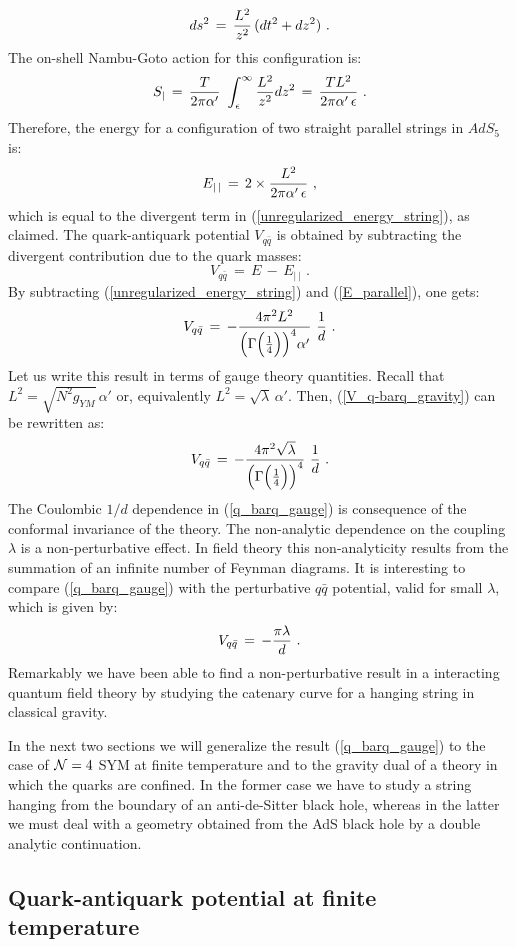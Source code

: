 \documentclass[12pt,notitlepage,a4paper]{article}
\newcommand{\beq}{\begin{equation}}
\newcommand{\eeq}{\end{equation}}
\begin{document}
\beq
ds^2\,=\,{L^2\over z^2}\,(dt^2+dz^2)\,\,.
\eeq
The on-shell Nambu-Goto action for this configuration is:
\beq
S_{|}\,=\,{T\over 2\pi\alpha'}\,\,\int_{\epsilon}^{\infty} {L^2\over z^2} dz^2\,=\,
{TL^2\over  2\pi\alpha'\,\epsilon}\,\,.
\eeq
Therefore, the energy for a configuration of two straight parallel strings in $AdS_5$ is:
\beq
E_{|\,|}\,=\,2\times {L^2\over  2\pi\alpha'\,\epsilon}\,\,,
\label{E_parallel}
\eeq
which is equal to the divergent term in (\ref{unregularized_energy_string}), as claimed. 
The quark-antiquark potential $V_{q\bar q}$ is obtained by subtracting the divergent contribution due to the quark masses:
\beq
V_{q\bar q}\,=\,E\,-\,E_{|\,|}\,\,.
\eeq
By subtracting (\ref{unregularized_energy_string}) and (\ref{E_parallel}), one gets:
\beq
V_{q\bar q}\,=\,-{4\pi^2 L^2\over \Big(\Gamma\Big({1\over 4}\Big)\Big)^4
\alpha'}\,\,{1\over d}\,\,.
\label{V_q-barq_gravity}
\eeq
Let us write this result in terms of gauge theory quantities. Recall that 
$L^2=\sqrt{N^2 g_{YM}}\,\alpha'$ or, equivalently $L^2=\sqrt{\lambda}\,\alpha'$. Then, (\ref{V_q-barq_gravity}) can be rewritten as:
\beq
V_{q\bar q}\,=\,-{4\pi^2 \sqrt{\lambda}\over \Big(\Gamma\Big({1\over 4}\Big)\Big)^4 }\,\,{1\over d}\,\,.
\label{q_barq_gauge}
\eeq
The Coulombic $1/d$ dependence in (\ref{q_barq_gauge}) is consequence of the conformal invariance of the theory. The non-analytic dependence on the coupling $\lambda$ is a non-perturbative effect. In field theory this non-analyticity  results from the summation of an infinite number of Feynman diagrams. It is interesting to compare (\ref{q_barq_gauge}) with the perturbative $q\bar q$ potential, valid for small $\lambda$, which is given by:
\beq
V_{q\bar q}\,=\,-{\pi\lambda\over d}\,\,.
\eeq
Remarkably we have been able to find a non-perturbative result in a interacting quantum field theory by studying the catenary curve for a hanging string in classical gravity. 

In the next two sections we will generalize the result (\ref{q_barq_gauge}) to the case of ${\cal N}=4$ SYM at finite temperature and to the gravity dual of a theory in which the quarks are confined. In the former case we have to study a string hanging from the boundary of an anti-de-Sitter black hole, whereas in the latter we must deal with a geometry obtained from the AdS black hole by a double analytic continuation. 



\subsection{Quark-antiquark potential at finite temperature}
\end{document}
